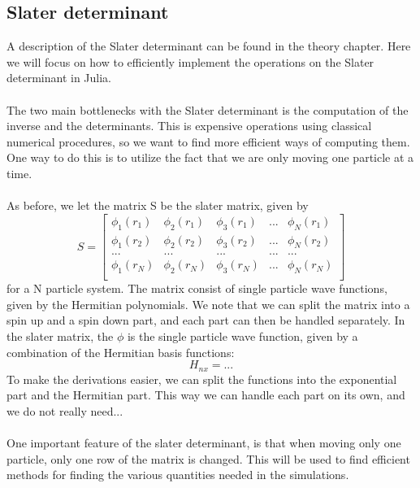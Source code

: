 \subsection{Slater determinant}
A description of the Slater determinant can be found in the theory chapter. Here we will focus on how to efficiently implement the operations on the Slater determinant in Julia. 
\\
\\
The two main bottlenecks with the Slater determinant is the computation of the inverse and the determinants. This is expensive operations using classical numerical procedures, so we want to find more efficient ways of computing them. One way to do this is to utilize the fact that we are only moving one particle at a time. 
\\
\\
As before, we let the matrix S be the slater matrix, given by
\begin{equation}
    S = 
    \begin{bmatrix}
    \phi_1(r_1) & \phi_2(r_1) & \phi_3(r_1) & ... & \phi_N(r_1) \\
    \phi_1(r_2) & \phi_2(r_2) & \phi_3(r_2) & ... & \phi_N(r_2) \\
    ... & ... & ... & ... & ... \\
    \phi_1(r_N) & \phi_2(r_N) & \phi_3(r_N) & ... & \phi_N(r_N) \\
    \end{bmatrix}
\end{equation}
for a N particle system. The matrix consist of single particle wave functions, given by the Hermitian polynomials. We note that we can split the matrix into a spin up and a spin down part, and each part can then be handled separately. In the slater matrix, the $\phi$ is the single particle wave function, given by a combination of the Hermitian basis functions:
\begin{equation}
    H_{nx} = ...
\end{equation}
To make the derivations easier, we can split the functions into the exponential part and the Hermitian part. This way we can handle each part on its own, and we do not really need... 
\\
\\
One important feature of the slater determinant, is that when moving only one particle, only one row of the matrix is changed. This will be used to find efficient methods for finding the various quantities needed in the simulations. 
